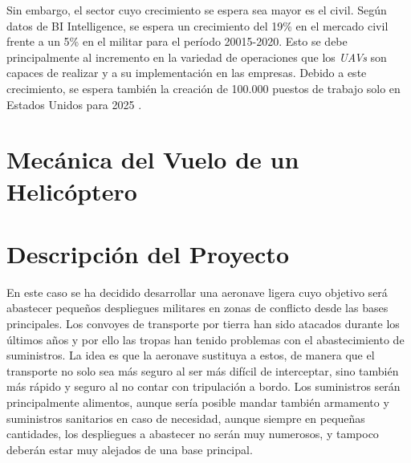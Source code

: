 Sin embargo, el sector cuyo crecimiento se espera sea mayor es el civil. Según datos de BI Intelligence, se espera un crecimiento del 19\% en el mercado civil frente a un 5\% en el militar para el período 20015-2020.
Esto se debe principalmente al incremento en la variedad de operaciones que los \emph{UAVs} son capaces de realizar y a su implementación en las empresas. Debido a este crecimiento, se espera también la creación de 100.000 puestos de trabajo solo en Estados Unidos para 2025 \cite{AUVSI}.\\

\section{Mecánica del Vuelo de un Helicóptero}


\section{Descripción del Proyecto}

En este caso se ha decidido desarrollar una aeronave ligera cuyo objetivo será abastecer pequeños despliegues militares en zonas de conflicto desde las bases principales. Los convoyes de transporte por tierra han sido atacados durante los últimos años y por ello las tropas han tenido problemas con el abastecimiento de suministros. La idea es que la aeronave sustituya a estos, de manera que el transporte no solo sea más seguro al ser más difícil de interceptar, sino también más rápido y seguro al no contar con tripulación a bordo. 
Los suministros serán principalmente alimentos, aunque sería posible mandar también armamento y suministros sanitarios en caso de necesidad, aunque siempre en pequeñas cantidades, los despliegues a abastecer no serán muy numerosos, y tampoco deberán estar muy alejados de una base principal.

